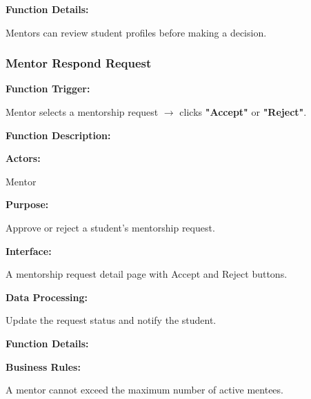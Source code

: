 \vspace{0.3cm}

\textbf{Function Details:}

Mentors can review student profiles before making a decision.

%

\subsubsection{Mentor Respond Request}

\textbf{Function Trigger:}

Mentor selects a mentorship request $\rightarrow$ clicks \textbf{"Accept"} or \textbf{"Reject"}.

\vspace{0.3cm}

\textbf{Function Description:}

\textbf{Actors:}

Mentor

\vspace{0.2cm}

\textbf{Purpose:}

Approve or reject a student's mentorship request.

\vspace{0.2cm}

\textbf{Interface:}

A mentorship request detail page with Accept and Reject buttons.

\vspace{0.2cm}

\textbf{Data Processing:}

Update the request status and notify the student.

\vspace{0.3cm}

\textbf{Function Details:}

\textbf{Business Rules:}

A mentor cannot exceed the maximum number of active mentees.

